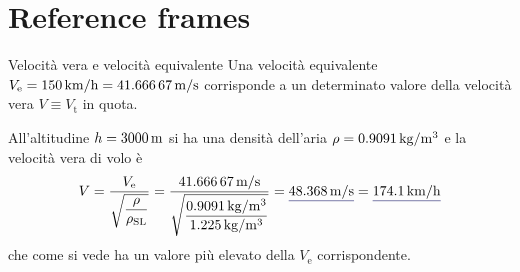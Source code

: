 \documentclass[[12pt,twoside]{book}
\begin{document}
%
%
\chapter%
   [Reference frames]%
   {Reference frames}
\label{chap:Reference:Frames}

\setcounter{minitocdepth}{2}%
\minitoc %

\vspace{\baselineskip}

\noindent
%

%
\begin{myExampleX}{Velocità vera e velocità equivalente}{}%
\label{example:Equivalent:Airspeed:Basic:A}
%
\noindent
Una velocità equivalente 
$V_\mathrm{e}
 =\SI[round-precision=0]{\myFlightSpeedEASKMH}{km/h}
 =\SI[round-precision=1]{\myFlightSpeedEASMTSec}{m/s}$
corrisponde a un determinato valore della velocità vera $V\equiv V_\mathrm{t}$ in quota.

All'altitudine $h=\SI[round-precision=0]{\myAltitudeMT}{m}$ si ha
una densità dell'aria $\rho=\SI[round-precision=3]{\myAirDensityKGMTcubed}{kg/m^3}$
e la velocità vera di volo è
\[
V = 
  \frac{ V_\text{e} }{ \sqrt{\dfrac{\rho}{\rho_\mathrm{SL}}} }
  = 
  \frac{
    \SI[round-precision=1]{\myFlightSpeedEASMTSec}{m/s}
  }{
    \sqrt{
      \dfrac{
        \SI[round-precision=3]{\myAirDensityKGMTcubed}{kg/m^3}
      }{
        \SI[round-precision=3]{\myISAAirDensitySeaLevelKGMTcubed}{kg/m^3}
      }
    }
  }
= 
  \mathunderline{mydarkblue}{ \SI[round-precision=1]{\myFlightSpeedMTSec}{\meter/\second} }
  = \mathunderline{mydarkblue}{ \SI[round-precision=1]{\myFlightSpeedKMH}{\kilo\meter/\hour} }
\]
che come si vede ha un valore più elevato della $V_\mathrm{e}$ corrispondente.

\end{myExampleX}
%
\end{document}
